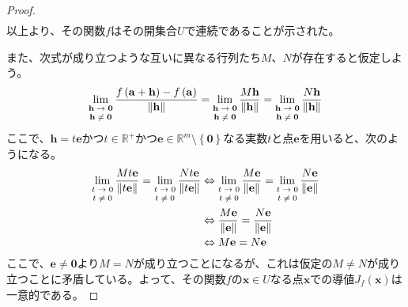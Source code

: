 \documentclass[dvipdfmx]{jsarticle}
\begin{document}
\begin{proof}
\begin{align*}
\end{align*}
以上より、その関数$f$はその開集合$U$で連続であることが示された。\par
また、次式が成り立つような互いに異なる行列たち$M$、$N$が存在すると仮定しよう。
\begin{align*}
\lim_{\scriptsize \begin{matrix}
\mathbf{h} \rightarrow \mathbf{0} \\
\mathbf{h} \neq \mathbf{0} \\
\end{matrix}}\frac{f\left( \mathbf{a} + \mathbf{h} \right) - f\left( \mathbf{a} \right)}{\left\| \mathbf{h} \right\|} = \lim_{\scriptsize \begin{matrix}
\mathbf{h} \rightarrow \mathbf{0} \\
\mathbf{h} \neq \mathbf{0} \\
\end{matrix}}\frac{M\mathbf{h}}{\left\| \mathbf{h} \right\|} = \lim_{\scriptsize \begin{matrix}
\mathbf{h} \rightarrow \mathbf{0} \\
\mathbf{h} \neq \mathbf{0} \\
\end{matrix}}\frac{N\mathbf{h}}{\left\| \mathbf{h} \right\|}
\end{align*}
ここで、$\mathbf{h} = t\mathbf{e}$かつ$t \in \mathbb{R}^{+}$かつ$\mathbf{e} \in \mathbb{R}^{m} \setminus \left\{ \mathbf{0} \right\}$なる実数$t$と点$\mathbf{e}$を用いると、次のようになる。
\begin{align*}
\lim_{\scriptsize \begin{matrix}
t \rightarrow 0 \\
t \neq 0 \\
\end{matrix}}\frac{Mt\mathbf{e}}{\left\| t\mathbf{e} \right\|} = \lim_{\scriptsize \begin{matrix}
t \rightarrow 0 \\
t \neq 0 \\
\end{matrix}}\frac{Nt\mathbf{e}}{\left\| t\mathbf{e} \right\|} &\Leftrightarrow \lim_{\scriptsize \begin{matrix}
t \rightarrow 0 \\
t \neq 0 \\
\end{matrix}}\frac{M\mathbf{e}}{\left\| \mathbf{e} \right\|} = \lim_{\scriptsize \begin{matrix}
t \rightarrow 0 \\
t \neq 0 \\
\end{matrix}}\frac{N\mathbf{e}}{\left\| \mathbf{e} \right\|}\\
&\Leftrightarrow \frac{M\mathbf{e}}{\left\| \mathbf{e} \right\|} = \frac{N\mathbf{e}}{\left\| \mathbf{e} \right\|}\\
&\Leftrightarrow M\mathbf{e} = N\mathbf{e}
\end{align*}
ここで、$\mathbf{e} \neq \mathbf{0}$より$M = N$が成り立つことになるが、これは仮定の$M \neq N$が成り立つことに矛盾している。よって、その関数$f$の$\mathbf{x} \in U$なる点$\mathbf{x}$での導値$J_{f}\left( \mathbf{x} \right)$は一意的である。
\end{proof}
\end{document}
